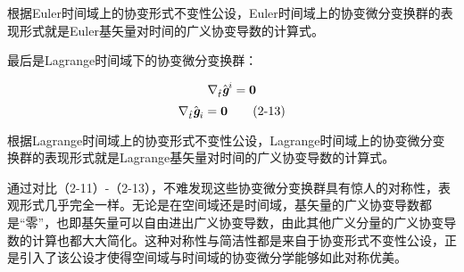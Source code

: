 \documentclass[UTF8]{ctexart}
\begin{document}
\par
根据Euler时间域上的协变形式不变性公设，Euler时间域上的协变微分变换群的表现形式就是Euler基矢量对时间的广义协变导数的计算式。\par
最后是Lagrange时间域下的协变微分变换群：\par
\begin{equation*}
    \nabla_{\hat{t}} \hat{\textit{\textbf{g}}}^i =\textbf{0}
\end{equation*}
\begin{equation*}
    \nabla_{\hat{t}} \hat{\textit{\textbf{g}}}_i =\textbf{0}
    \tag{2-13}
\end{equation*}
\par
根据Lagrange时间域上的协变形式不变性公设，Lagrange时间域上的协变微分变换群的表现形式就是Lagrange基矢量对时间的广义协变导数的计算式。\par
通过对比（2-11）-（2-13），不难发现这些协变微分变换群具有惊人的对称性，表观形式几乎完全一样。无论是在空间域还是时间域，基矢量的广义协变导数都是“零”，也即基矢量可以自由进出广义协变导数，由此其他广义分量的广义协变导数的计算也都大大简化。这种对称性与简洁性都是来自于协变形式不变性公设，正是引入了该公设才使得空间域与时间域的协变微分学能够如此对称优美。\par
\end{document}
